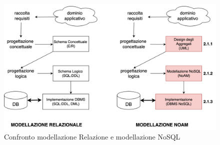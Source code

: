 \begin{figure}[H]
    \begin{center}
        \includegraphics[width=1\textwidth]{img/confrontoRelazionaleNosql}
    \end{center}
    \caption{Confronto modellazione Relazione e modellazione NoSQL}
\end{figure}

